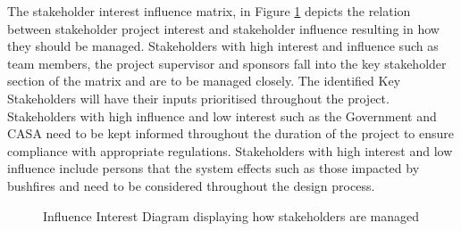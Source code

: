 The stakeholder interest influence matrix, in Figure \ref{fig:stakeholdermatrix} depicts the relation between stakeholder project interest and stakeholder influence resulting in how they should be managed. Stakeholders with high interest and influence such as team members, the project supervisor and sponsors fall into the key stakeholder section of the matrix and are to be managed closely. The identified Key Stakeholders will have their inputs prioritised throughout the project. Stakeholders with high influence and low interest such as the Government and CASA need to be kept informed throughout the duration of the project to ensure compliance with appropriate regulations. Stakeholders with high interest and low influence include persons that the system effects such as those impacted by bushfires and need to be considered throughout the design process. 


\begin{figure}[H]
    \centering
    
    \caption[Influence Interest Diagram]{Influence Interest Diagram displaying how stakeholders are managed}
    \label{fig:stakeholdermatrix}
\end{figure}